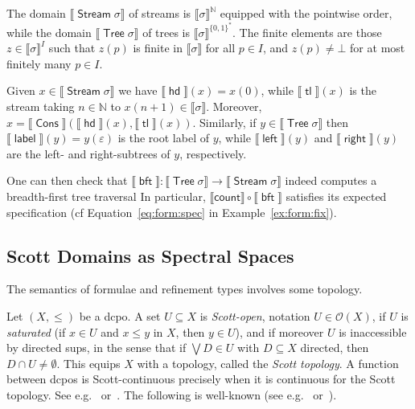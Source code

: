 \documentclass[%
  a4paper,
  UKenglish,
  cleveref,
  autoref,
  thm-restate,
  numberwithinsect,
]{lipics-v2021}
\newcommand\sle\subseteq
\newcommand\NN{\mathbb{N}}
\newcommand\I[1]{\llbracket #1 \rrbracket} %
\newcommand\es{\varepsilon}	%
\newcommand\comp{\mathbin\circ}
\newcommand\Open{\mathcal{O}}		%
\newcommand\term[1]{\mathsf{#1}}
\newcommand\type[1]{\term{#1}}
\newcommand\Cons{\mathop{\term{Cons}}}
\newcommand\hd{\mathop{\term{hd}}}
\newcommand\tl{\mathop{\term{tl}}}
\newcommand\lbl{\mathop{\term{label}}}
\newcommand\lft{\mathop{\term{left}}}
\newcommand\rght{\mathop{\term{right}}}
\newcommand\cnt{\term{count}}
\newcommand\bft{\mathop{\term{bft}}}
\newcommand\Stream{\mathop{\type{Stream}}}
\newcommand\Tree{\mathop{\type{Tree}}}
\newcommand\BT{A}			%
\newcommand\PTbis{\sigma}	%
\begin{document}
\begin{example}
\label{ex:scott:stream-tree}
The domain $\I{\Stream\PTbis}$ of streams is $\I\PTbis^\NN$
equipped with the pointwise order,
while the domain $\I{\Tree\PTbis}$ of trees is $\I\PTbis^{\{0,1\}^*}$.
The finite elements are those $z \in \I\PTbis^I$ such that $z(p)$ is finite in
$\I\PTbis$ for all $p \in I$,
and $z(p) \neq \bot$ for at most finitely many $p \in I$.

Given $x \in \I{\Stream\PTbis}$
we have $\I\hd(x) = x(0)$,
while $\I\tl(x)$ is the stream taking $n \in \NN$ to $x(n+1) \in \I\PTbis$.
Moreover, $x = \I\Cons(\I\hd(x),\I\tl(x))$.
%
Similarly, if $y \in \I{\Tree\PTbis}$
then $\I\lbl(y) = y(\es)$ is the root label of $y$,
while $\I\lft(y)$ and $\I\rght(y)$ are the left- and right-subtrees
of $y$, respectively.

One can then check that $\I\bft \colon \I{\Tree \PTbis} \to \I{\Stream \PTbis}$
indeed computes a breadth-first tree traversal%
%
In particular, $\I\cnt \comp \I\bft$
satisfies its expected specification
(cf Equation~\eqref{eq:form:spec} in Example~\ref{ex:form:fix}).
\lipicsEnd
\end{example}


\subsection{Scott Domains as Spectral Spaces}
\label{sec:spectral}

The semantics of formulae and refinement types involves some topology.

Let $(X,\leq)$ be a dcpo.
%
A set $U \sle X$ is \emph{Scott-open}, notation $U \in \Open(X)$,
if $U$ is \emph{saturated}
(if $x \in U$ and $x \leq y$ in $X$, then $y \in U$),
and if moreover $U$ is inaccessible by directed sups,
in the sense that if $\bigvee D \in U$
with $D \sle X$ directed, then $D \cap U \neq \emptyset$.
This equips $X$ with a topology, called the \emph{Scott topology}.
A function between dcpos is Scott-continuous
precisely when it is continuous for the Scott topology.
See e.g.~\cite[\S 1.2]{ac98book} or~\cite[\S 2.3]{aj95chapter}.
%
The following is well-known
(see e.g.~\cite[Theorem 7.2.29]{aj95chapter}
or~\cite[Theorem 7.47]{gg24book}).
\end{document}
